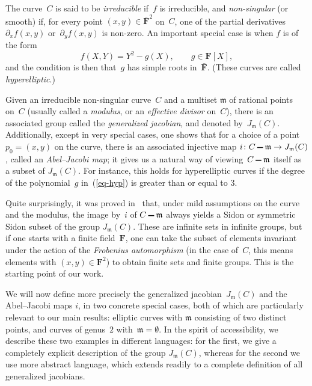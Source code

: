 \documentclass[12pt]{amsart}
\numberwithin{equation}{section}
\def\setminus{\mathchoice
    {\mathbin{\vrule height .62ex width 1.61ex depth -.38ex}}%
    {\mathbin{\vrule height .62ex width 1.61ex depth -.38ex}}%
    {\mathbin{\vrule height .50ex width 0.85ex depth -.28ex}}%
    {\mathbin{\vrule height .20ex width 0.570ex depth -.24ex}}%
}
\newcommand{\Ff}{\mathbf{F}}
\newcommand{\mfm}{\mathfrak{m}}
\theoremstyle{plain}
\theoremstyle{remark}
\theoremstyle{definition}
\begin{document}
The curve~$C$ is said to be \emph{irreducible} if~$f$ is irreducible,
and \emph{non-singular} (or smooth) if, for every point
$(x,y)\in\bar{\Ff}^2$ on~$C$, one of the partial derivatives
$\partial_xf(x,y)$ or~$\partial_yf(x,y)$ is non-zero. An important
special case is when $f$ is of the form
\begin{equation}\label{eq-hyp}
  f(X,Y)=Y^2-g(X),\quad\quad g\in \Ff[X],
\end{equation}
and the condition is then that~$g$ has simple roots
in~$\bar{\Ff}$. (These curves are called \emph{hyperelliptic}.)

Given an irreducible non-singular curve~$C$ and a multiset $\mfm$ of
rational points on~$C$ (usually called a \emph{modulus}, or an
\emph{effective divisor} on~$C$), there is an associated group called
the \emph{generalized jacobian}, and denoted by~$J_\mfm(C)$. Additionally,
except in very special cases, one shows that for a choice of a
point~$p_0=(x,y)$ on the curve, there is an associated injective map
$i\colon C\setminus\mfm \to J_\mfm(C)$, called an \emph{Abel--Jacobi
  map}; it gives us a natural way of viewing~$C\setminus \mfm$ itself as
a subset of $J_\mfm(C)$. For instance, this holds for hyperelliptic
curves if the degree of the polynomial~$g$ in~(\ref{eq-hyp}) is
greater than or equal to $3$.

Quite surprisingly, it was proved in~\cite{ffk2} that, under mild
assumptions on the curve and the modulus, the image by~$i$ of
$C\setminus \mfm$ always yields a Sidon or symmetric Sidon subset of the
group $J_\mfm(C)$. These are infinite sets in infinite groups, but if
one starts with a finite field~$\Ff$, one can take the subset of
elements invariant under the action of the \emph{Frobenius automorphism}
(in the case of~$C$, this means elements with $(x,y)\in\Ff^2$) to obtain
finite sets and finite groups. This is the starting point of our work.

We will now define more precisely the generalized
jacobian~$J_\mfm(C)$ and the Abel--Jacobi maps $i$, in two
concrete special cases, both of which are particularly relevant to our
main results: elliptic curves with $\mathfrak m$ consisting of two
distinct points, and curves of genus~$2$ with~$\mathfrak
m=\emptyset$. In the spirit of accessibility, we describe these two examples in different languages: for the first, we give a completely explicit description of the group $J_\mfm(C)$, whereas for the second we use more abstract language, which
extends readily to a complete definition of all generalized jacobians.
\end{document}
